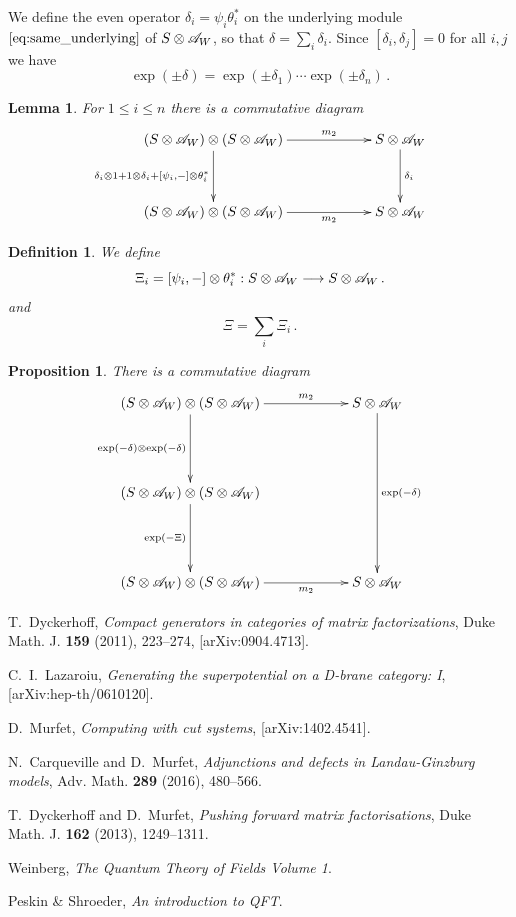 \documentclass[english,letter paper,12pt,leqno]{article}
\newtheorem{proposition}[theorem]{Proposition}
\newtheorem{lemma}[theorem]{Lemma}
\theoremstyle{example}
\newtheorem{definition}[theorem]{Definition}
\numberwithin{equation}{section}
\def\be{\begin{equation}}
\def\ee{\end{equation}}
\begin{document}
We define the even operator $\delta_i = \psi_i \theta_i^*$ on the underlying module $\eqref{eq:same_underlying}$ of $S \otimes \mathscr{A}_W$, so that $\delta = \sum_i \delta_i$. Since $[ \delta_i, \delta_j ] = 0$ for all $i,j$ we have
\be
\exp(\pm \delta) = \exp(\pm \delta_1) \cdots \exp(\pm \delta_n)\,.
\ee

\begin{lemma} For $1 \le i \le n$ there is a commutative diagram
\be
\xymatrix@C+3pc@R+1pc{
(S \otimes \md{A}_W) \otimes (S \otimes \md{A}_W) \ar[d]_-{\delta_i \otimes 1 + 1 \otimes \delta_i + [\psi_i,-] \otimes \theta_i^*} \ar[r]^-{m_2} & S \otimes \md{A}_W \ar[d]^-{\delta_i}\\
(S \otimes \md{A}_W) \otimes (S \otimes \md{A}_W) \ar[r]_-{m_2} & S \otimes \md{A}_W
}
\ee
\end{lemma}

\begin{definition} We define
\be
\Xi_i = [ \psi_i, - ] \otimes \theta_i^* : S \otimes \md{A}_W \lto S \otimes \md{A}_W\,.
\ee
and
\be
\Xi = \sum_i \Xi_i\,.
\ee
\end{definition}

\begin{proposition} There is a commutative diagram
\be
\xymatrix@C+3pc@R+2pc{
(S \otimes \md{A}_W) \otimes (S \otimes \md{A}_W) \ar[d]_-{\exp(-\delta) \otimes \exp(-\delta)} \ar[r]^-{m_2} & S \otimes \md{A}_W \ar[dd]^-{\exp(-\delta)}\\
(S \otimes \md{A}_W) \otimes (S \otimes \md{A}_W) \ar[d]_-{\exp(-\Xi)}\\
(S \otimes \md{A}_W) \otimes (S \otimes \md{A}_W) \ar[r]_-{m_2} & S \otimes \md{A}_W
}
\ee
\end{proposition}


\providecommand{\bysame}{\leavevmode\hbox to3em{\hrulefill}\thinspace}
\providecommand{\href}[2]{#2}
\begin{thebibliography}{BHLS03}
  
T.~Dyckerhoff, \textsl{Compact generators in categories of matrix factorizations},
  Duke Math. J. \textbf{159} (2011), 223--274,
  \href{http://arxiv.org/abs/0904.4713}{[arXiv:0904.4713]}.
  
C.~I.~Lazaroiu, \textsl{Generating the superpotential on a D-brane category: I}, [arXiv:hep-th/0610120].
  
D.~Murfet, \textsl{Computing with cut systems}, \href{http://arxiv.org/abs/1402.4541}{[arXiv:1402.4541]}.

N.~Carqueville and D.~Murfet, \textsl{Adjunctions and defects in Landau-Ginzburg models}, Adv. Math. \textbf{289} (2016), 480--566.

T.~Dyckerhoff and D.~Murfet, \textsl{Pushing forward matrix factorisations}, Duke Math. J. \textbf{162} (2013), 1249--1311.

Weinberg, \textsl{The Quantum Theory of Fields Volume 1}.

Peskin \& Shroeder, \textsl{An introduction to QFT}.

\end{thebibliography}
\end{document}
